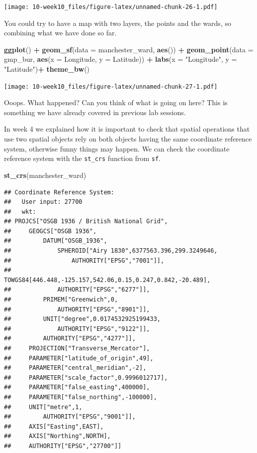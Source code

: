 \documentclass[]{book}
\newenvironment{Shaded}{\begin{snugshade}}{\end{snugshade}}
\newcommand{\DataTypeTok}[1]{\textcolor[rgb]{0.13,0.29,0.53}{#1}}
\newcommand{\KeywordTok}[1]{\textcolor[rgb]{0.13,0.29,0.53}{\textbf{#1}}}
\newcommand{\NormalTok}[1]{#1}
\newcommand{\OperatorTok}[1]{\textcolor[rgb]{0.81,0.36,0.00}{\textbf{#1}}}
\newcommand{\StringTok}[1]{\textcolor[rgb]{0.31,0.60,0.02}{#1}}
\begin{document}
\texttt{[image: 10-week10\_files/figure-latex/unnamed-chunk-26-1.pdf]}

You could try to have a map with two layers, the points and the wards, so combining what we have done so far.

\begin{Shaded}
\begin{Highlighting}[]
\KeywordTok{ggplot}\NormalTok{() }\OperatorTok{+}\StringTok{ }\KeywordTok{geom_sf}\NormalTok{(}\DataTypeTok{data =}\NormalTok{ manchester_ward, }\KeywordTok{aes}\NormalTok{()) }\OperatorTok{+}\StringTok{ }
\StringTok{  }\KeywordTok{geom_point}\NormalTok{(}\DataTypeTok{data =}\NormalTok{ gmp_bur, }\KeywordTok{aes}\NormalTok{(}\DataTypeTok{x =}\NormalTok{ Longitude, }\DataTypeTok{y =}\NormalTok{ Latitude)) }\OperatorTok{+}\StringTok{ }
\StringTok{  }\KeywordTok{labs}\NormalTok{(}\DataTypeTok{x =} \StringTok{"Longitude"}\NormalTok{, }\DataTypeTok{y =} \StringTok{"Latitude"}\NormalTok{)}\OperatorTok{+}
\StringTok{  }\KeywordTok{theme_bw}\NormalTok{()}
\end{Highlighting}
\end{Shaded}

\texttt{[image: 10-week10\_files/figure-latex/unnamed-chunk-27-1.pdf]}

Ooops. What happened? Can you think of what is going on here? This is something we have already covered in previous lab sessions.

In week 4 we explained how it is important to check that spatial operations that use two spatial objects rely on both objects having the same coordinate reference system, otherwise funny things may happen. We can check the coordinate reference system with the \texttt{st\_crs} function from \texttt{sf}.

\begin{Shaded}
\begin{Highlighting}[]
\KeywordTok{st_crs}\NormalTok{(manchester_ward)}
\end{Highlighting}
\end{Shaded}

\begin{verbatim}
## Coordinate Reference System:
##   User input: 27700 
##   wkt:
## PROJCS["OSGB 1936 / British National Grid",
##     GEOGCS["OSGB 1936",
##         DATUM["OSGB_1936",
##             SPHEROID["Airy 1830",6377563.396,299.3249646,
##                 AUTHORITY["EPSG","7001"]],
##             TOWGS84[446.448,-125.157,542.06,0.15,0.247,0.842,-20.489],
##             AUTHORITY["EPSG","6277"]],
##         PRIMEM["Greenwich",0,
##             AUTHORITY["EPSG","8901"]],
##         UNIT["degree",0.0174532925199433,
##             AUTHORITY["EPSG","9122"]],
##         AUTHORITY["EPSG","4277"]],
##     PROJECTION["Transverse_Mercator"],
##     PARAMETER["latitude_of_origin",49],
##     PARAMETER["central_meridian",-2],
##     PARAMETER["scale_factor",0.9996012717],
##     PARAMETER["false_easting",400000],
##     PARAMETER["false_northing",-100000],
##     UNIT["metre",1,
##         AUTHORITY["EPSG","9001"]],
##     AXIS["Easting",EAST],
##     AXIS["Northing",NORTH],
##     AUTHORITY["EPSG","27700"]]
\end{verbatim}
\end{document}
